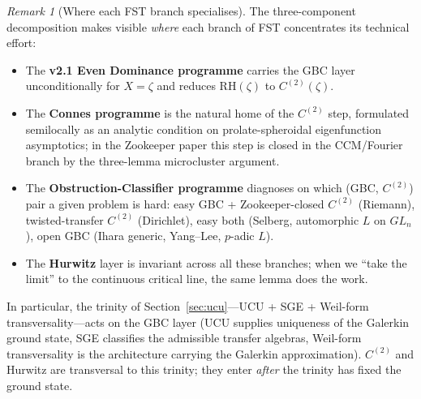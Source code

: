 \documentclass[11pt]{article}
\theoremstyle{definition}
\theoremstyle{remark}
\newtheorem{remark}[theorem]{Remark}
\begin{document}
\begin{remark}[Where each FST branch specialises]
\label{rem:three-component-specialisation}
The three-component decomposition makes visible \emph{where} each
branch of FST concentrates its technical effort:
\begin{itemize}
\item The \textbf{v2.1 Even Dominance programme}
\cite{Geiger2026RHII} carries the GBC layer unconditionally for
$X = \zeta$ and reduces $\mathrm{RH}(\zeta)$ to $C^{(2)}(\zeta)$.
\item The \textbf{Connes programme}
\cite{Connes2026,ConnesConsaniMoscovici2025} is the natural home of the
$C^{(2)}$ step, formulated semilocally as an analytic condition on
prolate-spheroidal eigenfunction asymptotics; in the Zookeeper paper
this step is closed in the CCM/Fourier branch by the three-lemma
microcluster argument.
\item The \textbf{Obstruction-Classifier programme}
\cite{GeigerObstructionClassifiers} diagnoses on which
(GBC, $C^{(2)}$) pair a given problem is hard: easy GBC +
Zookeeper-closed $C^{(2)}$ (Riemann), twisted-transfer
$C^{(2)}$ (Dirichlet), easy both (Selberg, automorphic
$L$ on $GL_n$), open GBC (Ihara generic, Yang--Lee, $p$-adic
$L$).
\item The \textbf{Hurwitz} layer is invariant across all these
branches; when we ``take the limit'' to the continuous critical
line, the same lemma does the work.
\end{itemize}
In particular, the trinity of Section~\ref{sec:ucu}---UCU + SGE +
Weil-form transversality---acts on the GBC layer (UCU supplies
uniqueness of the Galerkin ground state, SGE classifies the
admissible transfer algebras, Weil-form transversality is the
architecture carrying the Galerkin approximation). $C^{(2)}$ and
Hurwitz are transversal to this trinity; they enter \emph{after}
the trinity has fixed the ground state.
\end{remark}
\end{document}
